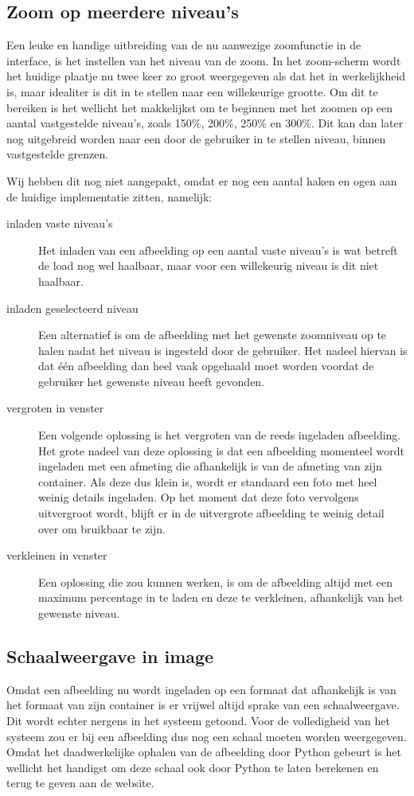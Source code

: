 \subsection{Zoom op meerdere niveau's}
Een leuke en handige uitbreiding van de nu aanwezige zoomfunctie in de interface, is het instellen van het niveau van de zoom.
In het zoom-scherm wordt het huidige plaatje nu twee keer zo groot weergegeven als dat het in werkelijkheid is, maar idealiter is dit in te stellen naar een willekeurige grootte.
Om dit te bereiken is het wellicht het makkelijkst om te beginnen met het zoomen op een aantal vastgestelde niveau's, zoals 150\%, 200\%, 250\% en 300\%.
Dit kan dan later nog uitgebreid worden naar een door de gebruiker in te stellen niveau, binnen vastgestelde grenzen.

Wij hebben dit nog niet aangepakt, omdat er nog een aantal haken en ogen aan de huidige implementatie zitten, namelijk:
\begin{description}
	\item[inladen vaste niveau's] Het inladen van een afbeelding op een aantal vaste niveau's is wat betreft de load nog wel haalbaar, maar voor een willekeurig niveau is dit niet haalbaar.
	\item[inladen geselecteerd niveau] Een alternatief is om de afbeelding met het gewenste zoomniveau op te halen nadat het niveau is ingesteld door de gebruiker.
	Het nadeel hiervan is dat \'{e}\'{e}n afbeelding dan heel vaak opgehaald moet worden voordat de gebruiker het gewenste niveau heeft gevonden.
	\item[vergroten in venster] Een volgende oplossing is het vergroten van de reeds ingeladen afbeelding.
	Het grote nadeel van deze oplossing is dat een afbeelding momenteel wordt ingeladen met een afmeting die afhankelijk is van de afmeting van zijn container.
Als deze dus klein is, wordt er standaard een foto met heel weinig details ingeladen.
Op het moment dat deze foto vervolgens uitvergroot wordt, blijft er in de uitvergrote afbeelding te weinig detail over om bruikbaar te zijn.
	\item[verkleinen in venster] Een oplossing die zou kunnen werken, is om de afbeelding altijd met een maximum percentage in te laden  en deze te verkleinen, afhankelijk van het gewenste niveau.
\end{description}

\subsection{Schaalweergave in image}
Omdat een afbeelding nu wordt ingeladen op een formaat dat afhankelijk is van het formaat van zijn container is er vrijwel altijd sprake van een schaalweergave.
Dit wordt echter nergens in het systeem getoond.
Voor de volledigheid van het systeem zou er  bij een afbeelding dus nog een schaal moeten worden weergegeven.
Omdat het daadwerkelijke ophalen van de afbeelding door Python gebeurt is het wellicht het handigst om deze schaal ook door Python te laten berekenen en terug te geven aan de website.

